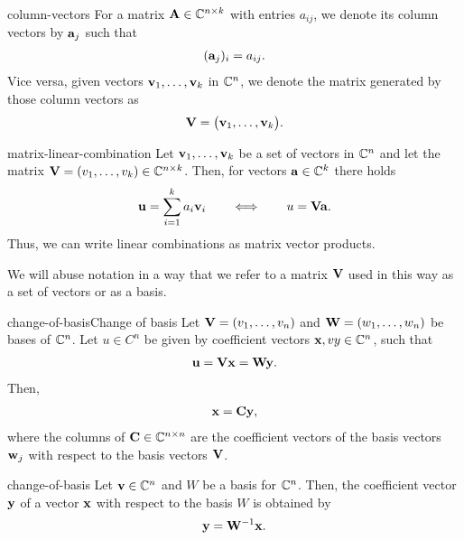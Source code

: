 \begin{Notation}{column-vectors}
  For a matrix $\mathbf A\in \mathbb C^{n\times k}$ with entries $a_{ij}$, we denote its column vectors by $\mathbf a_j$ such that
  \begin{gather}
      (\mathbf a_j)_i = a_{ij}.
  \end{gather}
  Vice versa, given vectors $\mathbf v_1,\dots,\mathbf v_k$ in $\mathbb C^n$, we denote the matrix generated by those column vectors as
  \begin{gather}
      \mathbf V = \bigl( \mathbf v_1,\dots,\mathbf v_k\bigr).
  \end{gather}
\end{Notation}

\begin{Notation}{matrix-linear-combination}
  Let $\mathbf v_1,\dots,\mathbf v_k$ be a set of vectors in $\mathbb C^n$ and let the matrix $\mathbf V=(v_1,\dots,v_k) \in \mathbb C^{n\times k}$. Then, for vectors $\mathbf a\in\mathbb C^k$ there holds
  \begin{gather}
      \mathbf u = \sum_{i=1}^k a_i \mathbf v_i
      \qquad \Longleftrightarrow \qquad
      u = \mathbf V \mathbf a.
  \end{gather}
  Thus, we can write linear combinations as matrix vector products.

  We will abuse notation in a way that we refer to a matrix $\mathbf V$
  used in this way as a set of vectors or as a basis.
\end{Notation}

\begin{Lemma*}{change-of-basis}{Change of basis}
  Let $\mathbf V = (v_1,\dots, v_n)$ and $\mathbf W = (w_1,\dots, w_n)$ be
  bases of $\mathbb C^n$. Let $u\in C^n$ be given by coefficient vectors
  $\mathbf x,vy\in \mathbb C^n$, such that
  \begin{gather}
    \mathbf u = \mathbf V\mathbf x = \mathbf W\mathbf y.
  \end{gather}
  Then,
  \begin{gather}
    \mathbf x = \mathbf C \mathbf y,
  \end{gather}
  where the columns of $\mathbf C\in \mathbb C^{n\times n}$ are the coefficient
  vectors of the basis vectors $\mathbf w_j$ with respect to the basis
  vectors $\mathbf V$.
\end{Lemma*}

\begin{Corollary}{change-of-basis}
  Let $\mathbf v\in \mathbb C^n$ and $W$ be a basis for $\mathbb C^n$. Then, the
  coefficient vector $\mathbf y$ of a vector $\mathbf x$ with respect to the
  basis $W$ is obtained by
  \begin{gather}
    \mathbf y = \mathbf W^{-1} \mathbf x.
  \end{gather}
\end{Corollary}

